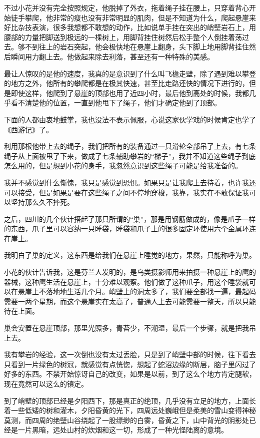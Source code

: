 不过小花并没有完全按照规定，他脱掉了外衣，拖着绳子挂在腰上，只穿着背心开始徒手攀爬，他非常的瘦也没有非常明显的肌肉，但是不知道为什么，爬起悬崖来好比杂技表演，很多我想都不敢想的动作，比如说单手挂在突出的峭壁岩石上，用腰部的力量把脚送到极远的一棵树上，用脚背挂住树然后松手整个人倒挂着荡过去。够不到往上的岩石突起，他会极快地在悬崖上翻身，头下脚上地用脚背挂住然后瞬间用力翻上去。他做起来除去利落，甚至还有一种特殊的美感。

最让人惊叹的是他的速度，我真的是意识到了什么叫飞檐走壁，除了遇到难以攀登的地方之外，他所有的攀爬都是在极其快速，甚至比走路还快的情况下进行的，但是即使这样，他爬到了悬崖的顶部也用了近四小时，最后他到高处的时候，我都几乎看不清楚他的位置，一直到他甩下了绳子，他们才确定他到了顶部。

下面的人都由衷地鼓掌，我也没法不表示佩服，心说这家伙学戏的时候肯定也学了《西游记》了。

利用那根他带上去的绳子，我们把所有的装备通过一只滑轮全部吊了上去，有七条绳子从上面被甩了下来，做成了七条辅助攀岩的“梯子”，我并不知道这些绳子到底怎么用的，但是想到小花的身手，我忽然意识到这些绳子可能是给我准备的。

我并不感觉到什么惭愧，我只是感觉到恐惧。如果只是让我爬上去待着，也许我还可以接受，但是如果是要在这些绳子之间不停地穿梭，我靠，我实在不敢保证我可以坚持那么久不摔死。

之后，四川的几个伙计搭起了那只所谓的“巢”，那是用钢筋做成的，像是爪子一样的东西，爪子里可以容纳一只睡袋，睡袋和爪子上的很多固定环使用六个金属环连在崖上。

我明白了巢的定义，这东西是给我们在悬崖上睡觉的地方，果然，只能称呼为巢。

小花的伙计告诉我，这是芬兰人发明的，是鸟类摄影师用来拍摄一种悬崖上的鹰的器械，这种鹰生活在悬崖上，十分难以观察。他们做了这种爪子，用这个睡袋就可以在悬崖上不落地地生活几个月。峭壁上的洞太多了，我们要全部找一遍，最起码需要一两个星期，而这个悬崖实在太高了，普通人上去可能需要一整天，所以只能待在上面。

巢会安置在悬崖顶部，那里光照多，青苔少，不潮湿，最后一个步骤，就是把我吊上去。

我有攀岩的经验，这一次倒也没有太过丢脸，只是到了峭壁中部的时候，往下看去只看到一片绿色的树冠，就感觉有点恍惚，想起了蛇沼边缘的断层，脑子里闪过了好多的东西。不禁开始惊讶自己的改变，如果是以前，到了这么个地方肯定腿软，现在竟然可以这么的镇定。

到了峭壁的顶部已经是夕阳西下，那是真正的绝顶，几乎没有立足的地方，上面长着一些低矮的树和灌木，夕阳昏黄的光下，四周远处巍峨但是柔美的雪山变得神秘莫测，而四周的绝壁山谷绕起了一股缥缈的白雾，昏黄之下，山中背光的阴影处已经是一片黑暗，远处山村的炊烟和这一切，形成了一种光怪陆离的意境。

